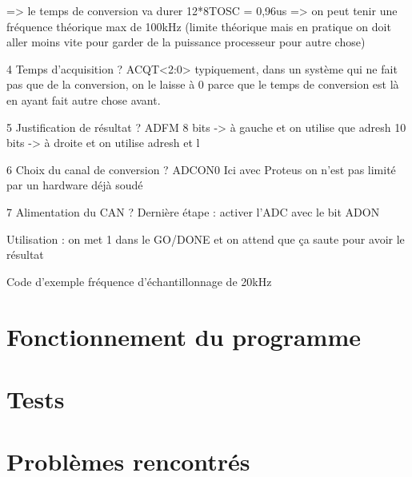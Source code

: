 \documentclass{article}
\begin{document}
    => le temps de conversion va durer 12*8TOSC = 0,96us
    => on peut tenir une fréquence théorique max de 100kHz
    (limite théorique mais en pratique on doit aller moins vite pour garder de la puissance processeur pour autre chose)

    4 Temps d'acquisition ? ACQT<2:0>
    typiquement, dans un système qui ne fait pas que de la conversion, on le laisse à 0 parce que le temps de conversion est là en ayant fait autre chose avant.

    5 Justification de résultat ? ADFM 
    8 bits -> à gauche et on utilise que adresh
    10 bits -> à droite et on utilise adresh et l

    6 Choix du canal de conversion ? ADCON0
    Ici avec Proteus on n'est pas limité par un hardware déjà soudé

    7 Alimentation du CAN ?
    Dernière étape : activer l'ADC avec le bit ADON

    Utilisation : on met 1 dans le GO/DONE et on attend que ça saute pour avoir le résultat

    Code d'exemple
    fréquence d'échantillonnage de 20kHz






    \section{Fonctionnement du programme}



    \section{Tests}



    \section{Problèmes rencontrés}
\end{document}
